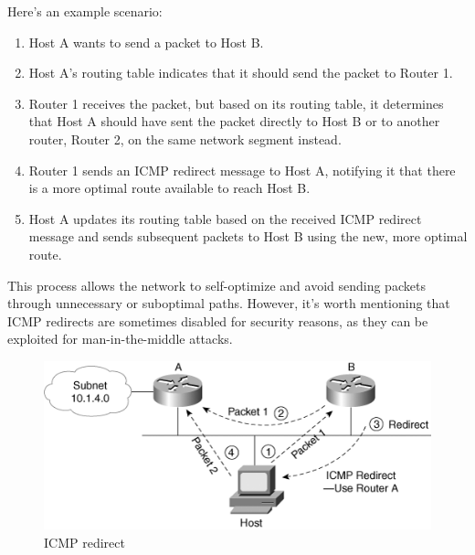 \vspace{1 em}
\noindent Here's an example scenario:
\begin{enumerate}
    \item Host A wants to send a packet to Host B.
    \item Host A's routing table indicates that it should send the packet to Router 1.
    \item Router 1 receives the packet, but based on its routing table, it determines that Host A should have sent the packet directly to Host B or to another router, Router 2, on the same network segment instead.
    \item Router 1 sends an ICMP redirect message to Host A, notifying it that there is a more optimal route available to reach Host B.
    \item Host A updates its routing table based on the received ICMP redirect message and sends subsequent packets to Host B using the new, more optimal route.
\end{enumerate}

\noindent This process allows the network to self-optimize and avoid sending packets through unnecessary or suboptimal paths. However, it's worth mentioning that ICMP redirects are sometimes disabled for security reasons, as they can be exploited for man-in-the-middle attacks.

\vspace{1 em}
\begin{figure}[H]
    \centering
    \includegraphics[width = 0.8\linewidth]{img/4/data-plane/ICMP-redirect.png}
    \caption{ICMP redirect}
    \label{fig:icmp-redirect}
\end{figure}


